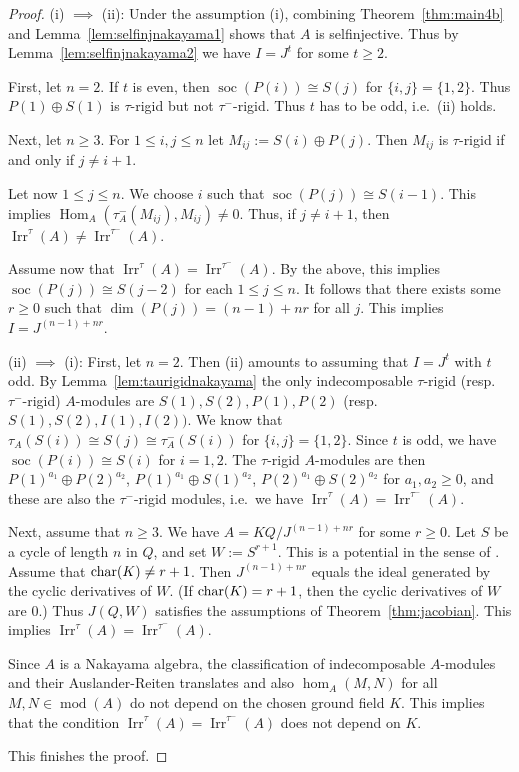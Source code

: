 \documentclass[12pt,reqno]{amsart}
\theoremstyle{definition}
\newcommand{\md}{\operatorname{mod}}
\newcommand{\soc}{\operatorname{soc}}
\newcommand{\Hom}{\operatorname{Hom}}
\newcommand{\irr}{\operatorname{Irr}}
\begin{document}
\begin{proof}
(i) $\implies$ (ii):
Under the assumption (i), combining
Theorem~\ref{thm:main4b} and Lemma~\ref{lem:selfinjnakayama1}
shows that
$A$ is selfinjective.
Thus by Lemma~\ref{lem:selfinjnakayama2} we have
$I = J^t$ for some $t \ge 2$.

First, let $n = 2$.
If $t$ is even, then $\soc(P(i)) \cong S(j)$ for $\{ i,j \} = \{ 1,2 \}$.
Thus $P(1) \oplus S(1)$ is $\tau$-rigid but not $\tau^-$-rigid.
Thus $t$ has to be odd, i.e.\ (ii) holds.

Next, let $n \ge 3$.
For $1 \le i,j \le n$ let $M_{ij} := S(i) \oplus P(j)$.
Then $M_{ij}$ is $\tau$-rigid if and only if $j \not= i+1$.

Let now $1 \le j \le n$.
We choose $i$ such that $\soc(P(j)) \cong S(i-1)$.
This implies $\Hom_A(\tau_A^-(M_{ij}),M_{ij}) \not= 0$.
Thus, if $j \not= i+1$, then $\irr^\tau(A) \not= \irr^{\tau^-}(A)$.

Assume now that $\irr^\tau(A) = \irr^{\tau^-}(A)$.
By the above, this implies
$\soc(P(j)) \cong S(j-2)$ for each $1 \le j \le n$.
It follows that there exists some $r \ge 0$ such that
$\dim(P(j)) = (n-1) +nr$ for all $j$.
This implies $I = J^{(n-1) + nr}$.


(ii) $\implies$ (i):
First, let $n=2$.
Then (ii) amounts to assuming that $I = J^t$ with $t$ odd.
By Lemma~\ref{lem:taurigidnakayama} the only indecomposable
$\tau$-rigid (resp. $\tau^-$-rigid) $A$-modules are $S(1),S(2),P(1),P(2)$ (resp. $S(1),S(2),I(1),I(2))$.
We know that $\tau_A(S(i)) \cong S(j) \cong \tau_A^-(S(i))$
for $\{ i,j \} = \{ 1,2 \}$.
Since $t$ is odd, we have $\soc(P(i)) \cong S(i)$ for $i=1,2$.
The $\tau$-rigid $A$-modules are
then $P(1)^{a_1} \oplus P(2)^{a_2}$,  $P(1)^{a_1} \oplus S(1)^{a_2}$,
 $P(2)^{a_1} \oplus S(2)^{a_2}$ for $a_1,a_2 \ge 0$, and these are also the
$\tau^-$-rigid modules,
i.e.\ we have
$\irr^\tau(A) = \irr^{\tau^-}(A)$.

Next,
assume that $n \ge 3$.
We have
$A = KQ/J^{(n-1) + nr}$ for some
$r \ge 0$.
Let $S$ be a cycle of length $n$ in $Q$, and set $W := S^{r+1}$.
This is a potential in the sense of \cite{DWZ08}.
Assume that ${\rm char}(K) \not= r+1$.
Then $J^{(n-1)+nr}$ equals the
ideal generated by the cyclic derivatives of
$W$.  (If ${\rm char}(K) = r+1$, then the cyclic derivatives of $W$
are $0$.)
Thus $J(Q,W)$ satisfies the assumptions of
Theorem~\ref{thm:jacobian}.
This implies
$\irr^\tau(A) = \irr^{\tau^-}(A)$.

Since $A$ is a Nakayama algebra, the classification of
indecomposable
$A$-modules and their Auslander-Reiten translates
and also $\hom_A(M,N)$ for all $M,N \in \md(A)$ do
not depend on the chosen ground field $K$.
This implies that the condition $\irr^\tau(A) = \irr^{\tau^-}(A)$
does not depend on $K$.

This finishes the proof.
\end{proof}
\end{document}
